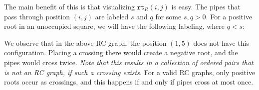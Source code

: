 \documentclass[a4paper,fleqn]{cas-sc}
\theoremstyle{definition}
\theoremstyle{remark}
\numberwithin{equation}{subsection}
\newcommand{\rtt}{\mathtt{rt}}
\begin{document}
The main benefit of this is that visualizing $\rtt_R(i,j)$ is easy. The pipes that pass through position $(i,j)$ are labeled $s$ and $q$ for some $s,q>0$. For a positive root in an unoccupied square, we will have the following labeling, where $q<s$:

\begin{center}
\end{center}

We observe that in the above RC graph, the position $(1,5)$ does not have this configuration. Placing a crossing there would create a negative root, and the pipes would cross twice. \emph{Note that this results in a collection of ordered pairs that is not an RC graph, if such a crossing exists.} For a valid RC graphs, only positive roots occur as crossings, and this happens if and only if pipes cross at most once.
\end{document}
